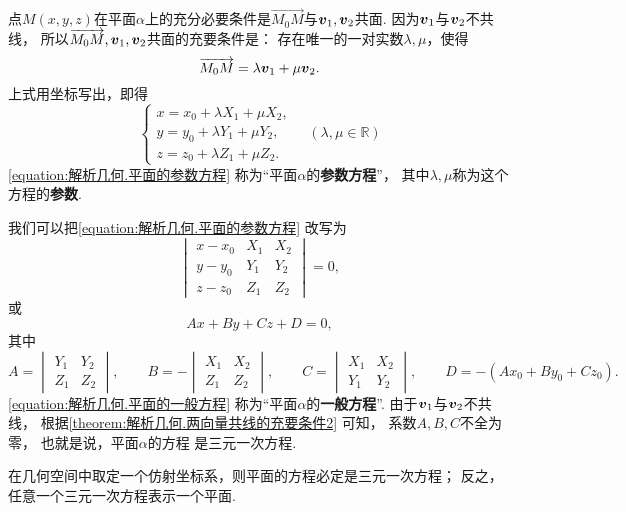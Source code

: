 点\(M(x,y,z)\)在平面\(\alpha\)上的充分必要条件是\(\vec{M_0 M}\)与\(\boldsymbol{v}_1,\boldsymbol{v}_2\)共面.
因为\(\boldsymbol{v}_1\)与\(\boldsymbol{v}_2\)不共线，
所以\(\overrightarrow{M_0 M},\boldsymbol{v}_1,\boldsymbol{v}_2\)共面的充要条件是：
存在唯一的一对实数\(\lambda,\mu\)，使得\[
	\overrightarrow{M_0 M} = \lambda \boldsymbol{v}_1 + \mu \boldsymbol{v}_2.
\]
上式用坐标写出，即得
\begin{equation}\label{equation:解析几何.平面的参数方程}
	\left\{ \begin{array}{l}
		x = x_0 + \lambda X_1 + \mu X_2, \\
		y = y_0 + \lambda Y_1 + \mu Y_2, \\
		z = z_0 + \lambda Z_1 + \mu Z_2.
	\end{array} \right.
	\quad(\lambda,\mu\in\mathbb{R})
\end{equation}
\cref{equation:解析几何.平面的参数方程}
称为“平面\(\alpha\)的\textbf{参数方程}”，
其中\(\lambda,\mu\)称为这个方程的\textbf{参数}.

我们可以把\cref{equation:解析几何.平面的参数方程} 改写为
\begin{equation}
	\begin{vmatrix}
		x - x_0 & X_1 & X_2 \\
		y - y_0 & Y_1 & Y_2 \\
		z - z_0 & Z_1 & Z_2
	\end{vmatrix} = 0,
\end{equation}
或\begin{equation}\label{equation:解析几何.平面的一般方程}
	A x + B y + C z + D = 0,
\end{equation}
其中\[
	A = \begin{vmatrix}
		Y_1 & Y_2 \\
		Z_1 & Z_2
	\end{vmatrix},
	\qquad
	B = -\begin{vmatrix}
		X_1 & X_2 \\
		Z_1 & Z_2
	\end{vmatrix},
	\qquad
	C = \begin{vmatrix}
		X_1 & X_2 \\
		Y_1 & Y_2
	\end{vmatrix},
	\qquad
	D = - (A x_0 + B y_0 + C z_0).
\]
\cref{equation:解析几何.平面的一般方程}
称为“平面\(\alpha\)的\textbf{一般方程}”.
由于\(\boldsymbol{v}_1\)与\(\boldsymbol{v}_2\)不共线，
根据\cref{theorem:解析几何.两向量共线的充要条件2} 可知，
系数\(A,B,C\)不全为零，
也就是说，平面\(\alpha\)的方程  是三元一次方程.

\begin{theorem}
在几何空间中取定一个仿射坐标系，则平面的方程必定是三元一次方程；
反之，任意一个三元一次方程表示一个平面.
\end{theorem}

